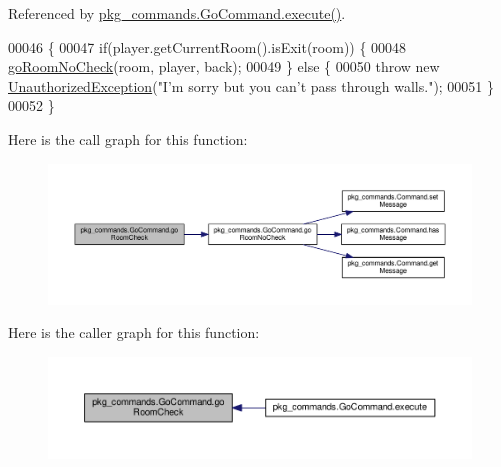 Referenced by \hyperlink{GoCommand_8java_source_l00028}{pkg\-\_\-commands.\-Go\-Command.\-execute()}.


\begin{DoxyCode}
00046                                                                                                            
                                       \{
00047         \textcolor{keywordflow}{if}(player.getCurrentRoom().isExit(room)) \{
00048             \hyperlink{classpkg__commands_1_1GoCommand_a210afbc5f3ef34d3ad5759d853c8f8c2}{goRoomNoCheck}(room, player, back);
00049         \} \textcolor{keywordflow}{else} \{
00050             \textcolor{keywordflow}{throw} \textcolor{keyword}{new} \hyperlink{classpkg__exceptions_1_1UnauthorizedException}{UnauthorizedException}(\textcolor{stringliteral}{"I'm sorry but you can't pass through
       walls."});
00051         \}
00052     \}
\end{DoxyCode}


Here is the call graph for this function\-:\nopagebreak
\begin{figure}[H]
\begin{center}
\leavevmode
\includegraphics[width=350pt]{classpkg__commands_1_1GoCommand_acbf1aa81fa5b1aef7cafb8b4e3ace3a9_cgraph}
\end{center}
\end{figure}




Here is the caller graph for this function\-:\nopagebreak
\begin{figure}[H]
\begin{center}
\leavevmode
\includegraphics[width=350pt]{classpkg__commands_1_1GoCommand_acbf1aa81fa5b1aef7cafb8b4e3ace3a9_icgraph}
\end{center}
\end{figure}


